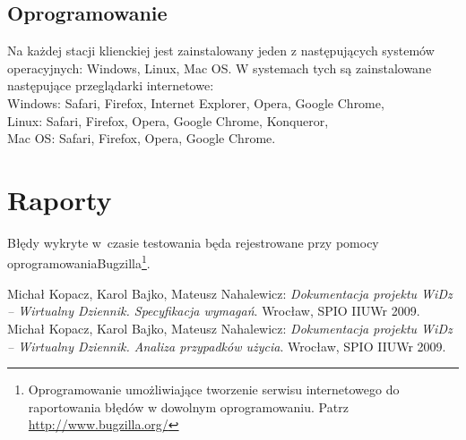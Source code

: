 \documentclass[12pt,leqno,twoside]{mwart}
\begin{document}
\subsection{Oprogramowanie}
\noindent Na każdej stacji klienckiej jest zainstalowany jeden z następujących systemów operacyjnych: Windows, Linux, Mac OS. W systemach tych są zainstalowane następujące przeglądarki internetowe: \\
	\indent Windows: Safari, Firefox, Internet Explorer, Opera, Google Chrome, \\
	\indent Linux: Safari, Firefox, Opera, Google Chrome, Konqueror,\\
	\indent Mac OS: Safari, Firefox, Opera, Google Chrome. \
\section{Raporty}
\noindent Błędy wykryte w~czasie testowania będa rejestrowane przy pomocy oprogramowania\linebreak Bugzilla\footnote{Oprogramowanie umożliwiające tworzenie serwisu internetowego do raportowania błędów w dowolnym oprogramowaniu. Patrz \url{http://www.bugzilla.org/}}. \\
\begin{thebibliography}{9}
	 Michał Kopacz, Karol Bajko, Mateusz Nahalewicz: {\it Dokumentacja projektu WiDz -- Wirtualny Dziennik. Specyfikacja wymagań}. Wrocław, SPIO IIUWr 2009.
	\bibitem{PU} Michał Kopacz, Karol Bajko, Mateusz Nahalewicz: {\it Dokumentacja projektu WiDz -- Wirtualny Dziennik. Analiza przypadków użycia}. Wrocław, SPIO IIUWr 2009.
\end{thebibliography}
\end{document}
